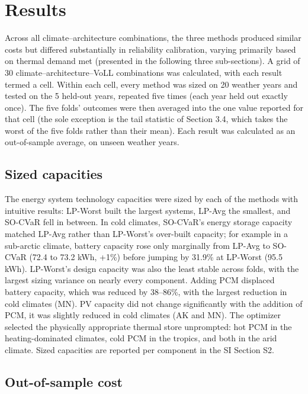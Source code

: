 \documentclass[
  journal=large,
  manuscript=article-type,
  year=2020,
  volume=37,
]{cup-journal}
\begin{document}
\section{Results}

Across all climate--architecture combinations, the three methods produced similar costs but differed substantially in reliability calibration, varying primarily based on thermal demand met (presented in the following three sub-sections).  A grid of 30 climate--architecture--VoLL combinations was calculated, with each result termed a cell. Within each cell, every method was sized on 20 weather years and tested on the 5 held-out years, repeated five times (each year held out exactly once). The five folds' outcomes were then averaged into the one value reported for that cell (the sole exception is the tail statistic of Section 3.4, which takes the worst of the five folds rather than their mean). Each result was calculated as an out-of-sample average, on unseen weather years.

\subsection{Sized capacities}

The energy system technology capacities were sized by each of the methods with intuitive results: LP-Worst built the largest systems, LP-Avg the smallest, and SO-CVaR fell in between. In cold climates, SO-CVaR's energy storage capacity matched LP-Avg rather than LP-Worst's over-built capacity; for example in a sub-arctic climate, battery capacity rose only marginally from LP-Avg to SO-CVaR (72.4 to 73.2 kWh, +1\%) before jumping by 31.9\% at LP-Worst (95.5 kWh). LP-Worst's design capacity was also the least stable across folds, with the largest sizing variance on nearly every component. Adding PCM displaced battery capacity, which was reduced by 38--86\%, with the largest reduction in cold climates (MN). PV capacity did not change significantly with the addition of PCM, it was slightly reduced in cold climates (AK and MN). The optimizer selected the physically appropriate thermal store unprompted: hot PCM in the heating-dominated climates, cold PCM in the tropics, and both in the arid climate. Sized capacities are reported per component in the SI Section S2.

\subsection{Out-of-sample cost}
\end{document}
